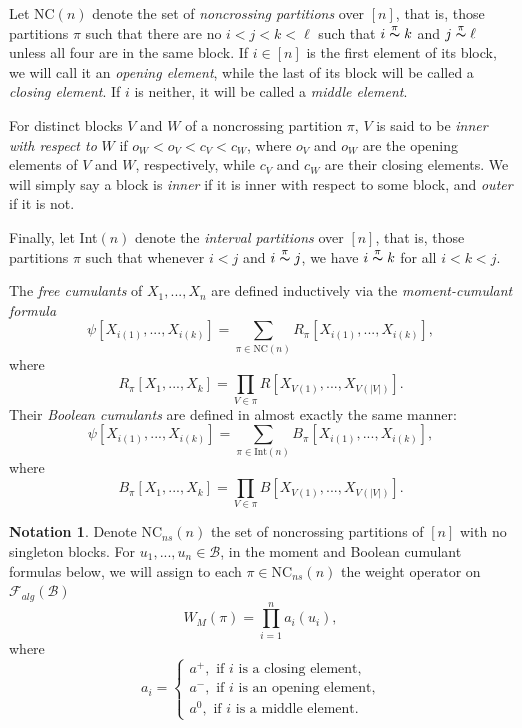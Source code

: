 \documentclass[12pt]{amsart}
\theoremstyle{definition}
\newtheorem{Notation}[Thm]{Notation}
\begin{document}
Let NC$(n)$ denote the set of \textit{noncrossing partitions} over $[n]$, that is, those partitions $\pi$ such that there are no $i < j < k < \ell$ such that $i \overset{\pi}{\thicksim} k$ and $j \overset{\pi}{\thicksim} \ell$ unless all four are in the same block.
If $i\in[n]$ is the first element of its block, we will call it an \textit{opening element}, while the last of its block will be called a \textit{closing element}. If $i$ is neither, it will be called a \textit{middle element}.

For distinct blocks $V$ and $W$ of a noncrossing partition $\pi$, $V$ is said to be \textit{inner with respect to} $W$ if $o_W < o_V < c_V < c_W$, where $o_V$ and $o_W$ are the opening elements of $V$ and $W$, respectively, while $c_V$ and $c_W$ are their closing elements. We will simply say a block is \textit{inner} if it is inner with respect to some block, and \textit{outer} if it is not.

Finally, let Int$(n)$ denote the \textit{interval partitions} over $[n]$, that is, those partitions $\pi$ such that whenever $i<j$ and $i \overset{\pi}{\thicksim} j$, we have $i \overset{\pi}{\thicksim} k$ for all $i < k < j$.

The \textit{free cumulants} of $X_1, ..., X_n$ are defined inductively via the \textit{moment-cumulant formula}
\begin{equation*}
\psi[X_{i(1)}, ..., X_{i(k)}] = \sum_{\pi\in\text{NC}(n)} R_\pi [X_{i(1)}, ..., X_{i(k)}],
\end{equation*}
where
\begin{equation*}
R_\pi [X_1, ..., X_k] = \prod_{V\in\pi} R[X_{V(1)}, ..., X_{V(|V|)}].
\end{equation*}
Their \textit{Boolean cumulants} are defined in almost exactly the same manner:
\begin{equation*}
\psi[X_{i(1)}, ..., X_{i(k)}] = \sum_{\pi\in\text{Int}(n)} B_\pi [X_{i(1)}, ..., X_{i(k)}],
\end{equation*}
where
\begin{equation*}
B_\pi [X_1, ..., X_k] = \prod_{V\in\pi} B[X_{V(1)}, ..., X_{V(|V|)}].
\end{equation*}

\begin{Notation}
Denote $\mathrm{NC}_{ns}(n)$ the set of noncrossing partitions of $[n]$ with no singleton blocks. For $u_1, ..., u_n \in\mathcal{B}$, in the moment and Boolean cumulant formulas below,  we will assign to each $\pi\in \mathrm{NC}_{ns}(n)$ the weight operator on $\mathcal{F}_{alg}(\mathcal{B})$
	\begin{equation*}
	W_M(\pi) = \prod_{i=1}^n a_i (u_i),
	\end{equation*}
	where
	\begin{equation*}
	a_i = \begin{cases}
	a^+, \text{ if }i\text{ is a closing element,} \\
	a^-, \text{ if }i\text{ is an opening element,} \\
	a^0, \text{ if }i\text{ is a middle element.}
	\end{cases}
	\end{equation*}
	
\end{Notation}
\end{document}
